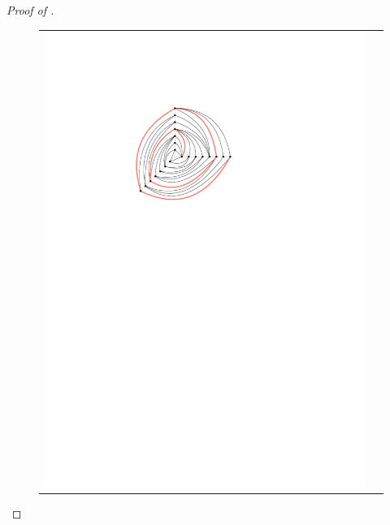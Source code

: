 \documentclass{patmorin}
\begin{document}
\begin{proof}[Proof of ]

  \begin{figure}
  \begin{center}
  \begin{tabular}{cc}
  \includegraphics{figs/graph-2}

\end{tabular}
\end{center}
\end{figure}
\end{proof}
\end{document}
